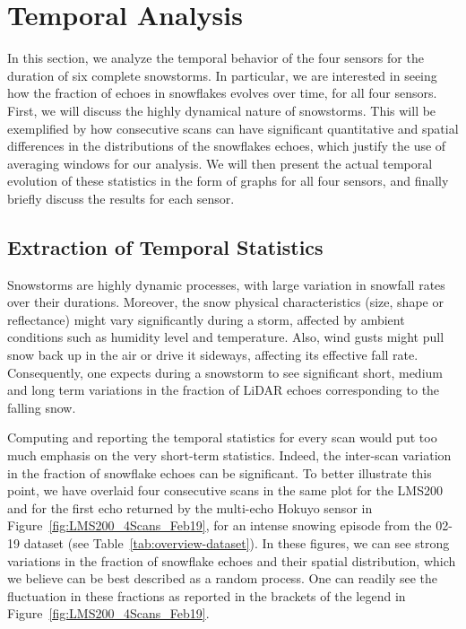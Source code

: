 \section{Temporal Analysis}
\label{sec:chap_lidar_temporal}

In this section, we analyze the temporal behavior of the four sensors for the duration of six complete snowstorms. In particular, we are interested in seeing how the fraction of echoes in snowflakes evolves over time, for all four sensors. First, we will discuss the highly dynamical nature of snowstorms. This will be exemplified by how consecutive scans can have significant quantitative and spatial differences in the distributions of the snowflakes echoes, which justify the use of averaging windows for our analysis. We will then present the actual temporal evolution of these statistics in the form of graphs for all four sensors, and finally briefly discuss the results for each sensor.

\subsection{Extraction of Temporal Statistics}

Snowstorms are highly dynamic processes, with large variation in snowfall rates over their durations. Moreover, the snow physical characteristics (size, shape or reflectance) might vary significantly during a storm, affected by ambient conditions such as humidity level and temperature. Also, wind gusts might pull snow back up in the air or drive it sideways, affecting its effective fall rate. Consequently, one expects during a snowstorm to see significant short, medium and long term variations in the fraction of LiDAR echoes corresponding to the falling snow.

Computing and reporting the temporal statistics for every scan would put too much emphasis on the very short-term statistics. Indeed, the inter-scan variation in the fraction of snowflake echoes can be significant. To better illustrate this point, we have overlaid four consecutive scans in the same plot for the LMS200 and for the first echo returned by the multi-echo Hokuyo sensor in Figure~\ref{fig:LMS200_4Scans_Feb19}, for an intense snowing episode from the 02-19 dataset (see Table~\ref{tab:overview-dataset}). In these figures, we can see strong variations in the fraction of snowflake echoes and their spatial distribution, which we believe can be best described as a random process. One can readily see the fluctuation in these fractions as reported in the brackets of the legend in Figure~\ref{fig:LMS200_4Scans_Feb19}.

